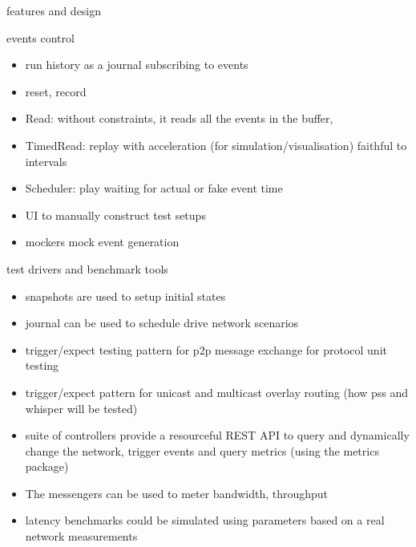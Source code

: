 \documentclass{beamer}
\begin{document}
\begin{section}{features and design}
\begin{frame}{}
\begin{block}{events control}
 \begin{itemize}
\item  run history as a journal subscribing to events
\item  reset, record
\item  Read: without constraints, it reads all the events in the buffer,
\item  TimedRead: replay with acceleration (for simulation/visualisation) faithful to intervals
\item  Scheduler: play waiting for actual or fake event time
\item  UI to manually construct test setups
\item  mockers mock event generation

\end{itemize}
\end{block}
\end{frame}

\begin{frame}{}
\begin{block}{test drivers and benchmark tools}
\begin{itemize}

\item  snapshots are used to setup initial states
\item  journal can be used to schedule drive network scenarios
\item  trigger/expect testing pattern for p2p message exchange for protocol unit testing
\item  trigger/expect pattern for unicast and multicast overlay routing (how pss and whisper will be tested)
\item  suite of controllers provide a resourceful REST API to query and dynamically change the network, trigger events and query metrics (using the metrics package)
\item  The messengers can be used to meter bandwidth, throughput
\item  latency benchmarks could be simulated using parameters based on a real network measurements

\end{itemize}
\end{block}
\end{frame}






\end{section}
\end{document}
